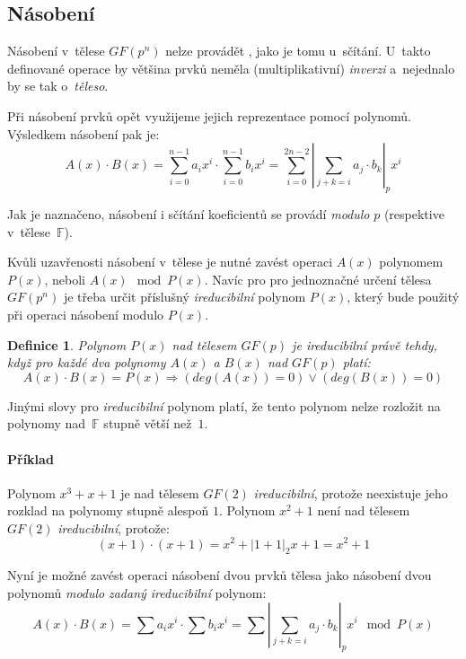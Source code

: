 \documentclass[thesis=M,czech,hidelinks]{FITthesis}[2012/06/26]
\newcommand{\0}{{\textcolor[gray]{0.75}{0}}}
\newtheorem{definice}{Definice}
\begin{document}
\subsection{Násobení}

Násobení v~tělese $GF(p^n)$ nelze provádět , jako je tomu
u~sčítání. U~takto definované operace by většina prvků neměla (multiplikativní)
\emph{inverzi} a~nejednalo by se tak o~\emph{těleso}.

Při násobení prvků opět využijeme jejich reprezentace pomocí polynomů.
Výsledkem násobení pak je:
$$
    A(x) \cdot B(x) = \sum_{i=0}^{n-1} a_i x^i \cdot \sum_{i=0}^{n-1} b_i x^i =
    \sum_{i=0}^{2n-2} \left|\sum_{j+k=i} a_j \cdot b_k\right|_p x^i
$$

Jak je naznačeno, násobení i sčítání koeficientů se provádí \emph{modulo} $p$
(respektive v~tělese~$\mathbb{F}$).

Kvůli uzavřenosti násobení v~tělese je nutné zavést operaci  $A(x)$ polynomem $P(x)$, neboli $A(x) \mod P(x)$. Navíc pro pro
jednoznačné určení tělesa $GF(p^n)$ je třeba určit příslušný \emph{ireducibilní}
polynom $P(x)$, který bude použitý při operaci násobení modulo $P(x)$.

\begin{definice}
    Polynom $P(x)$ nad tělesem $GF(p)$ je \emph{ireducibilní} právě tehdy, když
    pro každé dva polynomy $A(x)$ a $B(x)$ nad $GF(p)$ platí:
    $$
        A(x) \cdot B(x) = P(x) \Rightarrow \left( deg(A(x)) = 0 \right) \lor
        \left( deg(B(x)) = 0 \right)
    $$
\end{definice}

Jinými slovy pro \emph{ireducibilní} polynom platí, že tento polynom nelze
rozložit na polynomy nad~$\mathbb{F}$ stupně větší než~$1$.

\paragraph{Příklad} Polynom $x^3+x+1$ je nad tělesem $GF(2)$
\emph{ireducibilní}, protože neexistuje jeho rozklad na polynomy stupně alespoň
$1$. Polynom $x^2+1$ není nad tělesem $GF(2)$ \emph{ireducibilní}, protože:
$$ (x+1)\cdot(x+1) = x^2 + \left|1+1\right|_2x + 1 = x^2+1 $$

Nyní je možné zavést operaci násobení dvou prvků tělesa jako násobení dvou
polynomů \emph{modulo} \emph{zadaný ireducibilní} polynom:
$$
    A(x) \cdot B(x) = \sum a_i x^i \cdot \sum b_i x^i =
    \sum \left|\sum_{j+k=i} a_j \cdot b_k\right|_p x^i \mod P(x)
$$
\end{document}
